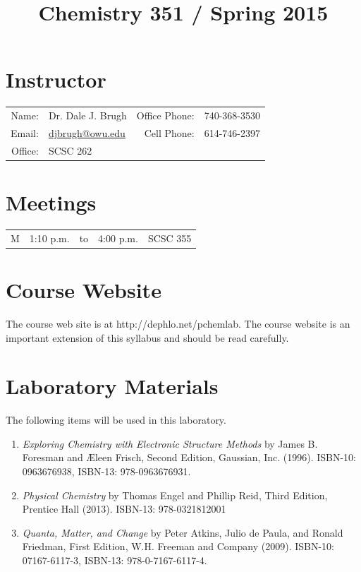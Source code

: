 \documentclass[letterpaper,oneside,onecolumn,11pt,article]{memoir}
\title{Chemistry 351 / Spring 2015}
\date{}
\author{}
\begin{document}
\maketitle
\thispagestyle{courseinformationtitle}
%
%
\section{Instructor}
\begin{tabular}{rl|rl}
Name: & Dr. Dale J. Brugh & Office Phone: & 740-368-3530 \\
Email: & \href{mailto:djbrugh@owu.edu}{djbrugh@owu.edu} & Cell Phone: & 614-746-2397 \\
Office: & SCSC 262 & &  \\
\end{tabular}
%
%
\section{Meetings}
\begin{tabular}{crcrl}
M & 1:10 p.m. & to & 4:00 p.m. & SCSC 355 \\
\end{tabular}

\section{Course Website}
The course web site is at http://dephlo.net/pchemlab. The course website is an important extension of this syllabus and should be read carefully. 

\section{Laboratory Materials}
The following items will be used in this laboratory. 
\begin{enumerate}[1.]
\item \textit{Exploring Chemistry with Electronic Structure Methods} by James B. Foresman and \AE leen Frisch, Second Edition, Gaussian, Inc. (1996). ISBN-10: 0963676938, ISBN-13: 978-0963676931.
\item \emph{Physical Chemistry} by Thomas Engel and Phillip Reid, Third Edition, Prentice Hall (2013).  ISBN-13: 978-0321812001
\item \emph{Quanta, Matter, and Change} by Peter Atkins, Julio de Paula, and Ronald Friedman, First Edition, W.H. Freeman and Company (2009). ISBN-10: 07167-6117-3, ISBN-13: 978-0-7167-6117-4.
\end{enumerate}
\end{document}
